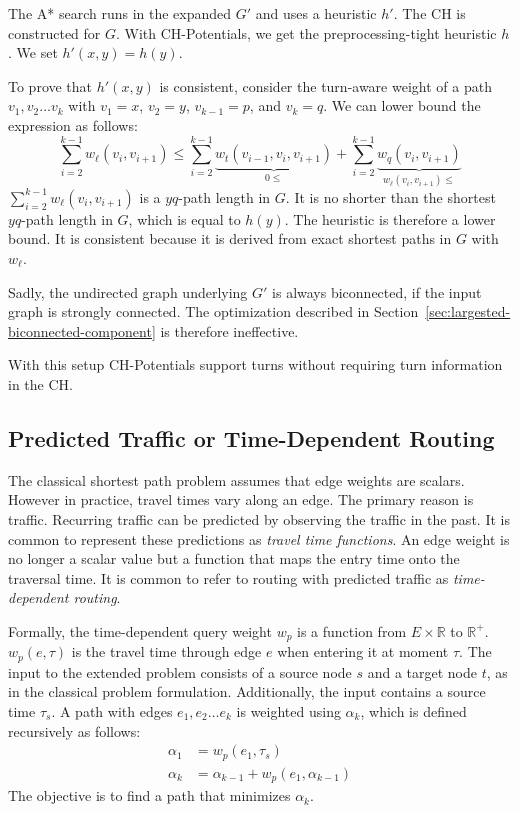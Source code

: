 \documentclass[letterpaper]{article} %
\begin{document}
The A* search runs in the expanded $G'$ and uses a heuristic $h'$.
The CH is constructed for $G$.
With CH-Potentials, we get the preprocessing-tight heuristic $h$.
We set $h'(x,y) = h(y)$.

To prove that $h'(x,y)$ is consistent, consider the turn-aware weight of a path $v_1,v_2\ldots v_k$ with $v_1=x$, $v_2=y$, $v_{k-1}=p$, and $v_k=q$.
We can lower bound the expression as follows:
\[
\sum_{i=2}^{k-1} w_\ell(v_i,v_{i+1}) \le \sum_{i=2}^{k-1} \underbrace{w_t(v_{i-1},v_i,v_{i+1})}_{0\le} + \sum_{i=2}^{k-1} \underbrace{w_q(v_i,v_{i+1})}_{w_\ell(v_i,v_{i+1})\le}
\]
$\sum_{i=2}^{k-1} w_\ell(v_i,v_{i+1})$ is a $yq$-path length in $G$.
It is no shorter than the shortest $yq$-path length in $G$, which is equal to $h(y)$.
The heuristic is therefore a lower bound.
It is consistent because it is derived from exact shortest paths in $G$ with $w_\ell$.

Sadly, the undirected graph underlying $G'$ is always biconnected, if the input graph is strongly connected.
The optimization described in Section~\ref{sec:largested-biconnected-component} is therefore ineffective.

With this setup CH-Potentials support turns without requiring turn information in the CH.

\subsection{Predicted Traffic or Time-Dependent Routing}
\label{sec:predicted-traffic}

The classical shortest path problem assumes that edge weights are scalars.
However in practice, travel times vary along an edge.
The primary reason is traffic.
Recurring traffic can be predicted by observing the traffic in the past.
It is common \cite{bgsv-mtdtt-13,bdpw-dtdrp-16,swz-sfert-19} to represent these predictions as \emph{travel time functions}.
An edge weight is no longer a scalar value but a function that maps the entry time onto the traversal time.
It is common to refer to routing with predicted traffic as \emph{time-dependent routing}.

Formally, the time-dependent query weight $w_p$ is a function from $E\times \mathbb{R}$ to $\mathbb{R}^+$.
$w_p(e, \tau)$ is the travel time through edge $e$ when entering it at moment $\tau$.
The input to the extended problem consists of a source node $s$ and a target node $t$, as in the classical problem formulation.
Additionally, the input contains a source time $\tau_s$.
A path with edges $e_1,e_2\ldots e_k$ is weighted using $\alpha_k$, which is defined recursively as follows:\[
\begin{split}
\alpha_{1} & = w_p(e_1, \tau_s) \\
\alpha_{k} & = \alpha_{k-1} + w_p(e_1, \alpha_{k-1})
\end{split}
\]
The objective is to find a path that minimizes $\alpha_k$.
\end{document}
